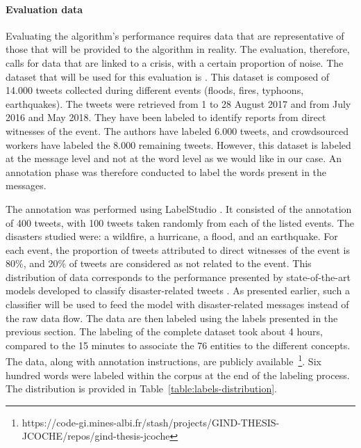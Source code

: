 \paragraph{Evaluation data}
Evaluating the algorithm's performance requires data that are representative of those that will be provided to the algorithm in reality.
The evaluation, therefore, calls for data that are linked to a crisis, with a certain proportion of noise.
The dataset that will be used for this evaluation is \textcite{zahraAutomaticIdentificationEyewitness2020}.
This dataset is composed of 14.000 tweets collected during different events (floods, fires, typhoons, earthquakes).
The tweets were retrieved from 1 to 28 August 2017 and from July 2016 and May 2018.
They have been labeled to identify reports from direct witnesses of the event.
The authors have labeled 6.000 tweets, and crowdsourced workers have labeled the 8.000 remaining tweets.
However, this dataset is labeled at the message level and not at the word level as we would like in our case.
An annotation phase was therefore conducted to label the words present in the messages.

The annotation was performed using LabelStudio \parencite{tkachenkoLabelStudioData2020}.
It consisted of the annotation of 400 tweets, with 100 tweets taken randomly from each of the listed events.
The disasters studied were: a wildfire, a hurricane, a flood, and an earthquake.
For each event, the proportion of tweets attributed to direct witnesses of the event is 80\%, and 20\% of tweets are considered as not related to the event.
This distribution of data corresponds to the performance presented by state-of-the-art models developed to classify disaster-related tweets \parencite{xukunImprovingDisasterrelatedTweet2020}.
As presented earlier, such a classifier will be used to feed the model with disaster-related messages instead of the raw data flow.
The data are then labeled using the labels presented in the previous section.
The labeling of the complete dataset took about 4 hours, compared to the 15 minutes to associate the 76 entities to the different concepts.
The data, along with annotation instructions, are publicly available~\footnote{https://code-gi.mines-albi.fr/stash/projects/GIND-THESIS-JCOCHE/repos/gind-thesis-jcoche}.
Six hundred words were labeled within the corpus at the end of the labeling process.
The distribution is provided in Table~\ref{table:labels-distribution}.

